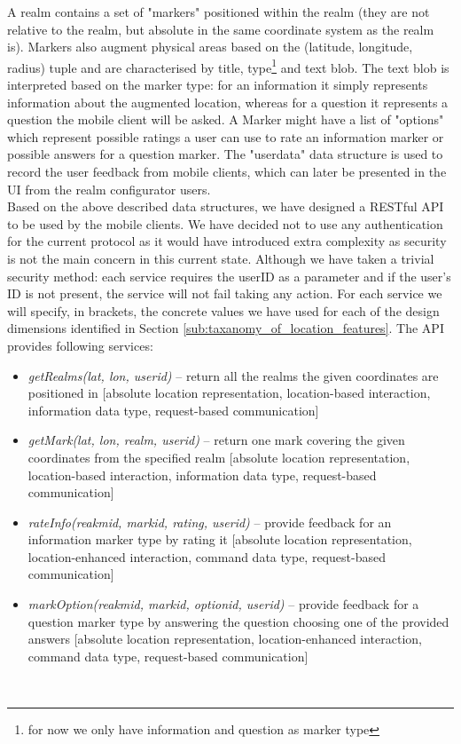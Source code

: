 \noindent A realm contains a set of "markers" positioned within the realm (they are not relative to the realm, but absolute in the same coordinate system as the realm is). Markers also augment physical areas based on the (latitude, longitude, radius) tuple and are characterised by title, type\footnote{for now we only have information and question as marker type} and text blob. The text blob is interpreted based on the marker type: for an information it simply represents information about the augmented location, whereas for a question it represents a question the mobile client will be asked. A Marker might have a list of "options" which represent possible ratings a user can use to rate an information marker or possible answers for a question marker. The "userdata" data structure is used to record the user feedback from mobile clients, which can later be presented in the UI from the realm configurator users.
\\

\noindent Based on the above described data structures, we have designed a RESTful API to be used by the mobile clients. We have decided not to use any authentication for the current protocol as it would have introduced extra complexity as security is not the main concern in this current state. Although we have taken a trivial security method: each service requires the userID as a parameter and if the user's ID is not present, the service will not fail taking any action. For each service we will specify, in brackets, the concrete values we have used for each of the design dimensions identified in Section \ref{sub:taxanomy_of_location_features}. The API provides following services:
\begin{itemize}
	\item \emph{getRealms(lat, lon, userid)} -- return all the realms the given coordinates are positioned in [absolute location representation, location-based interaction, information data type, request-based communication]
	\item \emph{getMark(lat, lon, realm, userid)} -- return one mark covering the given coordinates from the specified realm [absolute location representation, location-based interaction, information data type, request-based communication]
	\item \emph{rateInfo(reakmid, markid, rating, userid)} -- provide feedback for an information marker type by rating it [absolute location representation, location-enhanced interaction, command data type, request-based communication]
	\item \emph{markOption(reakmid, markid, optionid, userid)} -- provide feedback for a question marker type by answering the question choosing one of the provided answers [absolute location representation, location-enhanced interaction, command data type, request-based communication]
\end{itemize}
\\

